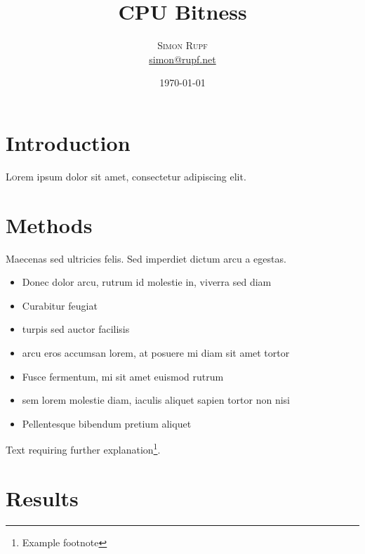\documentclass[twoside,twocolumn]{article}
\title{CPU Bitness} %
\author{%
\textsc{Simon Rupf} \\[1ex] %
\normalsize \href{mailto:simon@rupf.net}{simon@rupf.net} %
}
\date{\today} %
\begin{document}
\maketitle


\section{Introduction}

\lettrine[nindent=0em,lines=3]{L} orem ipsum dolor sit amet, consectetur adipiscing elit.
\blindtext %

\blindtext %


\section{Methods}

Maecenas sed ultricies felis. Sed imperdiet dictum arcu a egestas. 
\begin{itemize}
\item Donec dolor arcu, rutrum id molestie in, viverra sed diam
\item Curabitur feugiat
\item turpis sed auctor facilisis
\item arcu eros accumsan lorem, at posuere mi diam sit amet tortor
\item Fusce fermentum, mi sit amet euismod rutrum
\item sem lorem molestie diam, iaculis aliquet sapien tortor non nisi
\item Pellentesque bibendum pretium aliquet
\end{itemize}
\blindtext %

Text requiring further explanation\footnote{Example footnote}.


\section{Results}
\end{document}
